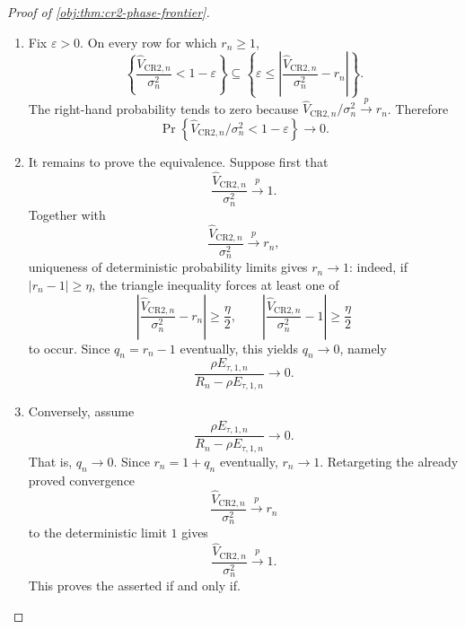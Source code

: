 \begin{proof}[Proof of \cref{obj:thm:cr2-phase-frontier}]
\begin{enumerate}
\item Fix \(\varepsilon>0\). On every row for which \(r_n\ge1\),
\[
\left\{
\frac{\widehat V_{\mathrm{CR2},n}}{\sigma_n^2}<1-\varepsilon
\right\}
\subseteq
\left\{
\varepsilon\le
\left|
\frac{\widehat V_{\mathrm{CR2},n}}{\sigma_n^2}-r_n
\right|
\right\}.
\]
The right-hand probability tends to zero because
\(\widehat V_{\mathrm{CR2},n}/\sigma_n^2\xrightarrow{p}r_n\). Therefore
\[
\Pr\!\left\{
\widehat V_{\mathrm{CR2},n}/\sigma_n^2<1-\varepsilon
\right\}\to0 .
\]

\item It remains to prove the equivalence. Suppose first that
\[
\frac{\widehat V_{\mathrm{CR2},n}}{\sigma_n^2}\xrightarrow{p}1 .
\]
Together with
\[
\frac{\widehat V_{\mathrm{CR2},n}}{\sigma_n^2}\xrightarrow{p}r_n,
\]
uniqueness of deterministic probability limits gives \(r_n\to1\): indeed, if \(|r_n-1|\ge\eta\), the triangle inequality forces at least one of
\[
\left|
\frac{\widehat V_{\mathrm{CR2},n}}{\sigma_n^2}-r_n
\right|\ge\frac{\eta}{2},
\qquad
\left|
\frac{\widehat V_{\mathrm{CR2},n}}{\sigma_n^2}-1
\right|\ge\frac{\eta}{2}
\]
to occur. Since \(q_n=r_n-1\) eventually, this yields \(q_n\to0\), namely
\[
\frac{\rho E_{\tau,1,n}}{R_n-\rho E_{\tau,1,n}}\to0 .
\]

\item Conversely, assume
\[
\frac{\rho E_{\tau,1,n}}{R_n-\rho E_{\tau,1,n}}\to0 .
\]
That is, \(q_n\to0\). Since \(r_n=1+q_n\) eventually, \(r_n\to1\). Retargeting the already proved convergence
\[
\frac{\widehat V_{\mathrm{CR2},n}}{\sigma_n^2}\xrightarrow{p}r_n
\]
to the deterministic limit \(1\) gives
\[
\frac{\widehat V_{\mathrm{CR2},n}}{\sigma_n^2}\xrightarrow{p}1 .
\]
This proves the asserted if and only if. %
\end{enumerate}
\end{proof}

